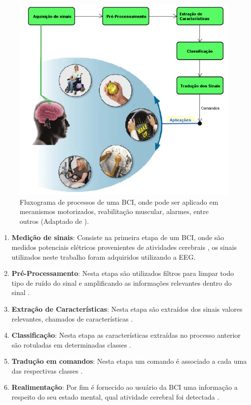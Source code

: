 \begin{figure}[h!]
	\centering
	\includegraphics[keepaspectratio=true,scale=0.6]{figuras/Fluxograma_BCI.PNG}
	\caption{Fluxograma de processos de uma BCI, onde pode ser aplicado em mecanismos motorizados, reabilitação muscular, alarmes, entre outros (Adaptado de \cite{BCIWolpaw}).}
	\label{BCI_flow}
\end{figure}

\begin{enumerate}
	\item \textbf{Medição de sinais}: Consiste na primeira etapa de um BCI, onde são medidos potenciais elétricos provenientes de atividades cerebrais \cite{SIULYDissertacao}, os sinais utilizados neste trabalho foram adquiridos utilizando a EEG.
	\item \textbf{Pré-Processamento}: Nesta etapa são utilizados filtros para limpar todo tipo de ruído do sinal e amplificando as informações relevantes dentro do sinal \cite{SIULYDissertacao}.
	\item \textbf{Extração de Características}: Nesta etapa são extraídos dos sinais valores relevantes, chamados de características \cite{SIULYDissertacao}.
	\item \textbf{Classificação}: Nesta etapa as características extraídas no processo anterior são rotuladas em determinadas classes \cite{SIULYDissertacao}. 
	\item \textbf{Tradução em comandos}: Nesta etapa um comando é associado a cada uma das respectivas classes \cite{SIULYDissertacao}.
	\item \textbf{Realimentação}: Por fim é fornecido ao usuário da BCI uma informação a respeito do seu estado mental, qual atividade cerebral foi detectada \cite{SIULYDissertacao}.
\end{enumerate}

